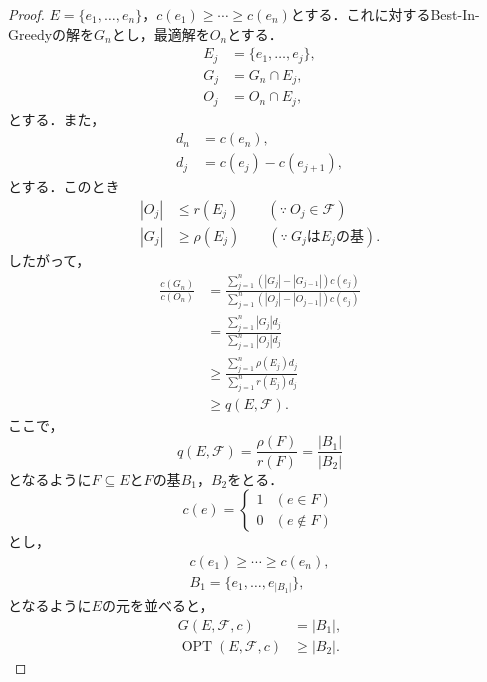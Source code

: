 \documentclass[xelatex,ja=standard,a4paper,14pt,everyparhook=compat]{bxjsarticle}
\newcommand{\mcF}{\mathcal{F}}
\DeclareMathOperator{\OPT}{OPT}
\theoremstyle{definition}
\begin{document}
\begin{proof}
    $E = \{e_1,\ldots,e_n\}$，$c(e_1) \geq \cdots \geq c(e_n)$とする．これに対するBest-In-Greedyの解を$G_n$とし，最適解を$O_n$とする． \begin{align*}
        E_j &= \{e_1,\ldots,e_j\}, \\
        G_j &= G_n \cap E_j, \\
        O_j &= O_n \cap E_j,
    \end{align*}
    とする．また， \begin{align*}
        d_n &= c(e_n), \\
        d_j &= c(e_j) - c(e_{j+1}),
    \end{align*}
    とする．このとき \begin{align*}
        |O_j| &\leq r(E_j) \qquad (\because\ O_j \in \mcF) \\
        |G_j| &\geq \rho(E_j) \qquad (\because\ \text{$G_j$は$E_j$の基}).
    \end{align*}
    したがって， \begin{align*}
        \frac{c(G_n)}{c(O_n)}
        &= \frac{\sum_{j=1}^n (|G_j|-|G_{j-1}|) c(e_j)}{\sum_{j=1}^n (|O_j|-|O_{j-1}|) c(e_j)} \\
        &= \frac{\sum_{j=1}^n |G_j| d_j}{\sum_{j=1}^n |O_j| d_j} \\
        &\geq \frac{\sum_{j=1}^n \rho(E_j) d_j}{\sum_{j=1}^n r(E_j) d_j} \\
        &\geq q(E,\mcF).
    \end{align*}
    ここで，
    \begin{equation*}
        q(E,\mcF) = \frac{\rho(F)}{r(F)} = \frac{|B_1|}{|B_2|}
    \end{equation*}
    となるように$F \subseteq E$と$F$の基$B_1$，$B_2$をとる． \begin{equation*}
        c(e) = \begin{cases}
            1 & (e \in F) \\
            0 & (e \notin F)
        \end{cases}
    \end{equation*}
    とし， \begin{gather*}
        c(e_1) \geq \cdots \geq c(e_n), \\
        B_1 = \{e_1, \ldots, e_{|B_1|}\},
    \end{gather*}
    となるように$E$の元を並べると， \begin{align*}
        G(E,\mcF,c) &= |B_1|, \\
        \OPT(E,\mcF,c) &\geq |B_2|.
    \end{align*}
\end{proof}
\end{document}
